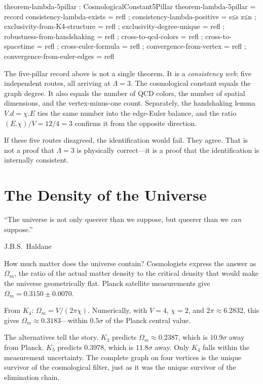 \documentclass[11pt,a4paper]{book}
\def\cdot{.}%
\begin{document}
\begin{code}
theorem-lambda-5pillar : CosmologicalConstant5Pillar
theorem-lambda-5pillar = record
  { consistency-lambda-exists = refl
  ; consistency-lambda-positive = s≤s z≤n
  ; exclusivity-from-K4-structure = refl
  ; exclusivity-degree-unique = refl
  ; robustness-from-handshaking = refl
  ; cross-to-qcd-colors = refl
  ; cross-to-spacetime = refl
  ; cross-euler-formula = refl
  ; convergence-from-vertex = refl
  ; convergence-from-euler-edges = refl }
\end{code}

The five-pillar record above is not a single theorem. It is a \emph{consistency web}: five independent routes, all arriving at $\Lambda = 3$. The cosmological constant equals the graph degree. It also equals the number of QCD colors, the number of spatial dimensions, and the vertex-minus-one count. Separately, the handshaking lemma $V \cdot d = \chi \cdot E$ ties the same number into the edge-Euler balance, and the ratio $(E \cdot \chi)/V = 12/4 = 3$ confirms it from the opposite direction.

If these five routes disagreed, the identification would fail. They agree. That is not a proof that $\Lambda = 3$ is physically correct---it is a proof that the identification is internally consistent.

\chapter{The Density of the Universe}
\label{ch:density-parameter}

\epigraph{``The universe is not only queerer than we suppose, but queerer than we \emph{can} suppose.''}{J.B.S.~Haldane}

How much matter does the universe contain? Cosmologists express the answer as $\Omega_m$, the ratio of the actual matter density to the critical density that would make the universe geometrically flat. Planck satellite measurements give $\Omega_m = 0.3150 \pm 0.0070$.

From $K_4$: $\Omega_m = V / (2\pi\chi)$. Numerically, with $V = 4$, $\chi = 2$, and $2\pi \approx 6.2832$, this gives $\Omega_m \approx 0.3183$---within $0.5\sigma$ of the Planck central value.

The alternatives tell the story. $K_3$ predicts $\Omega_m \approx 0.2387$, which is $10.9\sigma$ away from Planck. $K_5$ predicts $0.3978$, which is $11.8\sigma$ away. Only $K_4$ falls within the measurement uncertainty. The complete graph on four vertices is the unique survivor of the cosmological filter, just as it was the unique survivor of the elimination chain.
\end{document}

